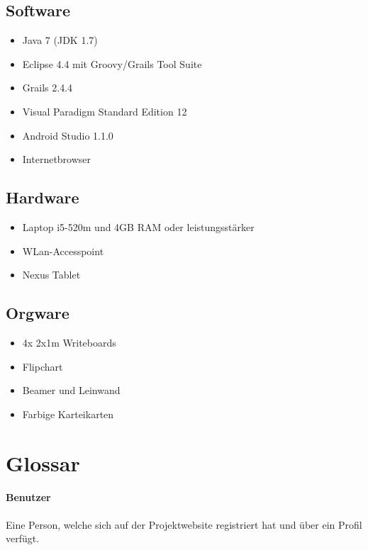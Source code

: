 \documentclass[10pt,a4paper]{article}
\begin{document}
\subsection{Software}
\begin{itemize}
	\item Java 7 (JDK 1.7)
	\item Eclipse 4.4 mit Groovy/Grails Tool Suite
	\item Grails 2.4.4
	\item Visual Paradigm Standard Edition 12
	\item Android Studio 1.1.0
	\item Internetbrowser
\end{itemize}
\subsection{Hardware}
\begin{itemize}
	\item Laptop i5-520m und 4GB RAM oder leistungsst\"arker
	\item WLan-Accesspoint
	\item Nexus Tablet
\end{itemize}
\subsection{Orgware}
\begin{itemize}
	\item 4x 2x1m Writeboards
	\item Flipchart
	\item Beamer und Leinwand
	\item Farbige Karteikarten
\end{itemize}

\section{Glossar}

\paragraph{Benutzer} Eine Person, welche sich auf der Projektwebsite registriert hat und über ein Profil verfügt.
\end{document}
